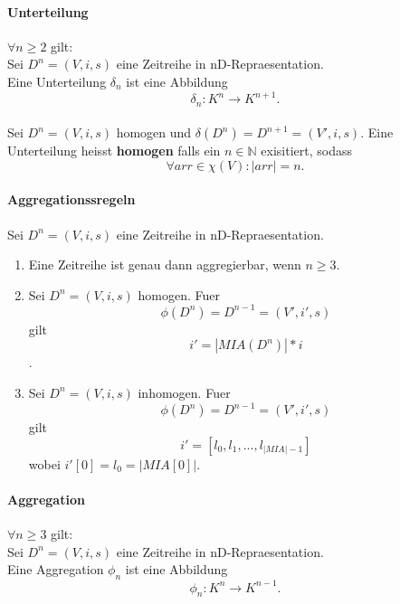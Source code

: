\documentclass[12pt]{article}
\begin{document}
			\paragraph{Unterteilung}
				$\forall n \geq 2$ gilt:\\
				Sei $D^{n} = (V, i, s)$ eine Zeitreihe in nD-Repraesentation.\\[0.0cm]
				Eine Unterteilung $\delta_{n}$ ist eine Abbildung 
				\begin{equation}
					\delta_{n}: K^{n} \rightarrow K^{n+1}.
				\end{equation}\\[0.3cm]
				Sei $D^{n} = (V, i, s)$ homogen und $\delta(D^{n}) = D^{n+1} = (V', i, s)$.
				Eine Unterteilung heisst \textbf{homogen} falls ein $n \in \mathbb{N}$ exisitiert, sodass
				\begin{equation}
					\forall arr \in \chi(V): |arr| = n.
				\end{equation}
				
			\paragraph{Aggregationssregeln}
				Sei $D^{n} = (V, i, s)$ eine Zeitreihe in nD-Repraesentation.\\[0.3cm]
			
				\begin{enumerate}
					\item{Eine Zeitreihe ist genau dann aggregierbar, wenn $n \geq 3$.}
					\item{Sei $D^{n} = (V, i, s)$ homogen. Fuer 
						\begin{equation}
							\phi(D^{n}) = D^{n-1} = (V', i', s)
						\end{equation}
						gilt 
						\begin{equation}
							i' = |MIA(D^{n})|*i
						\end{equation}
						.
					}
					\item{Sei $D^{n} = (V, i, s)$ inhomogen. Fuer
						\begin{equation}
							\phi(D^{n}) = D^{n-1} = (V', i', s)
						\end{equation}
						gilt 
						\begin{equation}
							i' = [l_{0}, l_{1}, ..., l_{|MIA| - 1}]
						\end{equation}
						wobei $i'[0] = l_{0} = |MIA[0]|$.
					}
				\end{enumerate}
				
			\paragraph{Aggregation}
				$\forall n \geq 3$ gilt:\\
				Sei $D^{n} = (V, i, s)$ eine Zeitreihe in nD-Repraesentation.\\[0.3cm]
				Eine Aggregation $\phi_{n}$ ist eine Abbildung 
				\begin{equation}
					\phi_{n}: K^{n} \rightarrow K^{n-1}.
				\end{equation}
				
\end{document}
